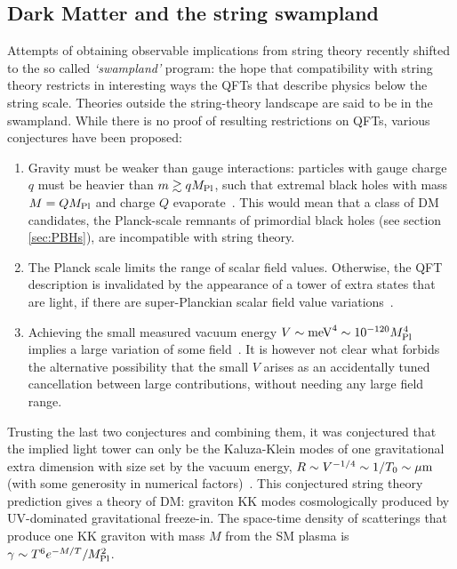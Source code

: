 \subsection{Dark Matter and the string swampland}\label{sec:swampland}
Attempts of obtaining observable implications from string theory recently shifted to the so called {\em `swampland'} program:
the hope that compatibility with string theory restricts in interesting ways the 
QFTs that describe physics below the string scale.
Theories outside the string-theory landscape are said to be in the swampland.
While there is no proof of  resulting restrictions on QFTs, various conjectures have been proposed:
\begin{enumerate}
\item Gravity must be weaker than gauge interactions: particles with gauge charge $q$ must be heavier than $m \gtrsim q M_{\rm Pl}$,
such that extremal black holes with mass $M = Q M_{\rm Pl}$ and charge $Q$
evaporate~\cite{SwamplandDM}.
This would mean that a class of DM candidates, the Planck-scale remnants of primordial black holes (see section \ref{sec:PBHs}), 
are incompatible with string theory.

\item The Planck scale limits the range of scalar field values. Otherwise, the QFT description is invalidated by the appearance of a tower of
extra  states  that are light, if there are super-Planckian scalar field value variations~\cite{SwamplandDM}. 

\item Achieving the small measured vacuum energy 
$V\sim {\rm meV}^4\sim 10^{-120}M_{\rm Pl}^4$ implies a large variation of some field~\cite{SwamplandDM}.
It is however not clear what  forbids the alternative possibility that the small $V$ arises as an accidentally tuned cancellation 
between large contributions, without needing any large field range. 
\end{enumerate}
Trusting the last two conjectures and combining them, it was conjectured that the implied light tower 
can only be the Kaluza-Klein modes of one gravitational extra dimension 
with size set by the vacuum energy, $R\sim V^{-1/4}\sim 1/T_0\sim \mu{\rm m}$
(with some generosity in numerical factors)~\cite{SwamplandDM}.
This conjectured string theory prediction gives a theory of DM: 
graviton KK modes  cosmologically produced by UV-dominated gravitational freeze-in.
The space-time density of scatterings that produce one KK graviton with mass $M$ from the SM plasma
is $\gamma \sim T^6 e^{-M/T}/M_{\rm Pl}^2$.
